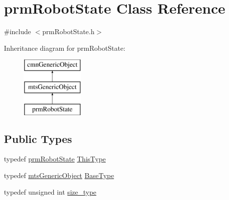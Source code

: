 \hypertarget{classprm_robot_state}{\section{prm\-Robot\-State Class Reference}
\label{classprm_robot_state}
}


{\ttfamily \#include $<$prm\-Robot\-State.\-h$>$}

Inheritance diagram for prm\-Robot\-State\-:\begin{figure}[H]
\begin{center}
\leavevmode
\includegraphics[height=3.000000cm]{d3/d02/classprm_robot_state}
\end{center}
\end{figure}
\subsection*{Public Types}
\begin{DoxyCompactItemize}
\item 
typedef \hyperlink{classprm_robot_state}{prm\-Robot\-State} \hyperlink{classprm_robot_state_ae29f0a2f1d1f44400da6e8191bc06475}{This\-Type}
\item 
typedef \hyperlink{classmts_generic_object}{mts\-Generic\-Object} \hyperlink{classprm_robot_state_a602400b6ea7b54575290cc5207fc0167}{Base\-Type}
\item 
typedef unsigned int \hyperlink{classprm_robot_state_a2cf2c739d5b3cdd3f9d44e2878183d90}{size\-\_\-type}
\end{DoxyCompactItemize}
